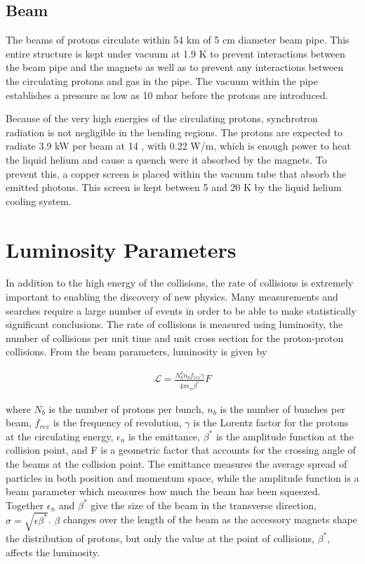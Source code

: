 \subsection{Beam}

The beams of protons circulate within 54 km of 5 cm diameter beam pipe.
This entire structure is kept under vacuum at 1.9 K to prevent interactions between the beam pipe and the magnets as well as to prevent any interactions between the circulating protons and gas in the pipe. 
The vacuum within the pipe establishes a pressure as low as 10 mbar before the protons are introduced.

Because of the very high energies of the circulating protons, synchrotron radiation is not negligible in the bending regions.
The protons are expected to radiate 3.9 kW per beam at 14 \TeV, with 0.22 W/m, which is enough power to heat the liquid helium and cause a quench were it absorbed by the magnets.
To prevent this, a copper screen is placed within the vacuum tube that absorb the emitted photons.
This screen is kept between 5 and 20 K by the liquid helium cooling system.


\section{Luminosity Parameters}

In addition to the high energy of the collisions, the rate of collisions is extremely important to enabling the discovery of new physics.
Many measurements and searches require a large number of events in order to be able to make statistically significant conclusions.
The rate of collisions is measured using luminosity, the number of collisions per unit time and unit cross section for the proton-proton collisions.
From the beam parameters, luminosity is given by 

\begin{align}
\mathcal{L} = \frac{N_b^2 n_b f_{rev} \gamma}{4\pi \epsilon_n \beta^*} F \label{eq:luminosity} 
\end{align}

\noindent where $N_b$ is the number of protons per bunch, $n_b$ is the number of bunches per beam, $f_{rev}$ is the frequency of revolution, $\gamma$ is the Lorentz factor for the protons at the circulating energy, $\epsilon_n$ is the emittance, $\beta^*$ is the amplitude function at the collision point, and F is a geometric factor that accounts for the crossing angle of the beams at the collision point. 
The emittance measures the average spread of particles in both position and momentum space, while the amplitude function is a beam parameter which measures how much the beam has been squeezed. 
Together $\epsilon_n$ and $\beta^*$ give the size of the beam in the transverse direction, $\sigma = \sqrt{\epsilon\beta^*}$. 
$\beta$ changes over the length of the beam as the accessory magnets shape the distribution of protons, but only the value at the point of collisions, $\beta^*$, affects the luminosity.

